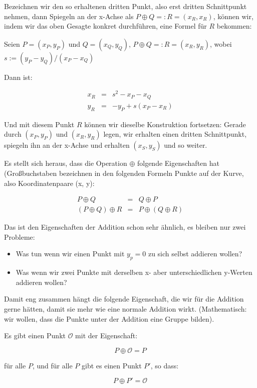 \documentclass{article}
\begin{document}
Bezeichnen wir den so erhaltenen dritten Punkt, also erst dritten Schnittpunkt
nehmen, dann Spiegeln an der x-Achse als $P \oplus Q =: R = (x_R, x_R)$,
können wir, indem wir das oben Gesagte konkret durchführen, eine Formel für $R$
bekommen:


Seien $P=(x_P, y_P)$ und $Q=(x_Q, y_Q)$, $P \oplus Q =: R = (x_R, y_R)$, wobei
$s := (y_P - y_Q) / (x_P - x_Q)$

Dann ist:

\begin{eqnarray*}
  x_R & = & s^2 - x_P - x_Q \\
  y_R & = & - y_P + s (x_P - x_R)
\end{eqnarray*}

Und mit diesem Punkt $R$ können wir dieselbe Konstruktion fortsetzen: Gerade
durch $(x_P, y_P)$ und $(x_R, y_R)$ legen, wir erhalten einen dritten
Schnittpunkt, spiegeln ihn an der x-Achse und erhalten $(x_S, y_S)$ und so
weiter.

Es stellt sich heraus, dass die Operation $\oplus$ folgende Eigenschaften hat
(Großbuchstaben bezeichnen in den folgenden Formeln Punkte auf der Kurve, also
Koordinatenpaare (x, y):

\begin{eqnarray*}
  P \oplus Q & = & Q \oplus P \\
  (P \oplus Q) \oplus R & = & P \oplus (Q \oplus R)
\end{eqnarray*}

Das ist den Eigenschaften der Addition schon sehr ähnlich, es bleiben nur zwei
Probleme:
\begin{itemize}
\item Was tun wenn wir einen Punkt mit $y_p = 0$ zu sich selbst addieren wollen?
\item Was wenn wir zwei Punkte mit derselben x- aber unterschiedlichen y-Werten
  addieren wollen?
\end{itemize}

Damit eng zusammen hängt die folgende Eigenschaft, die wir für die Addition
gerne hätten, damit sie mehr wie eine normale Addition wirkt. (Mathematisch:
wir wollen, dass die Punkte unter der Addition eine Gruppe bilden).

Es gibt einen Punkt $\mathcal{O}$ mit der Eigenschaft:

$$  P \oplus \mathcal{O} = P $$

für alle $P$, und für alle $P$ gibt es einen Punkt $P'$, so dass:

$$  P \oplus P' = \mathcal{O} $$
\end{document}
